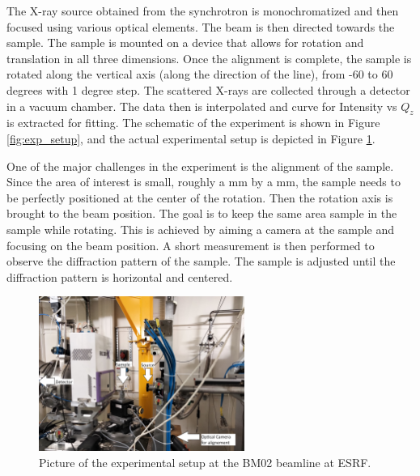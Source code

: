 The X-ray source obtained from the synchrotron is monochromatized and then focused using
various optical elements. The beam is then directed towards the sample. The 
sample is mounted on a device that allows for rotation and translation in all 
three dimensions. Once the alignment is complete, the sample is rotated along the vertical axis (along the direction of the line), from -60
to 60 degrees with 1 degree step. The scattered X-rays are collected through a detector in a 
vacuum chamber. The data then is interpolated and curve for Intensity vs $Q_{z}$ is extracted for fitting. The schematic of the experiment is shown in Figure \ref{fig:exp_setup},
and the actual experimental setup is depicted in Figure \ref{fig:exp_setup_real}.

\medskip

One of the major challenges in the experiment is the alignment of the sample. Since the area of interest is small, roughly a mm by a mm,
the sample needs to be perfectly positioned at the center of the rotation. Then the rotation axis is brought to the beam position. 
The goal is to keep the same area sample in the sample while rotating. This is achieved by 
aiming a camera at the sample and focusing on the beam position. A short measurement is then performed to observe the diffraction pattern of the sample.
The sample is adjusted until the diffraction pattern is horizontal and centered.

\begin{figure}[h]
\centering
\includegraphics[width=0.6\textwidth]{images/photo_exp.jpg}
\caption{Picture of the experimental setup at the BM02 beamline at ESRF.}
\label{fig:exp_setup_real}
\end{figure}%

